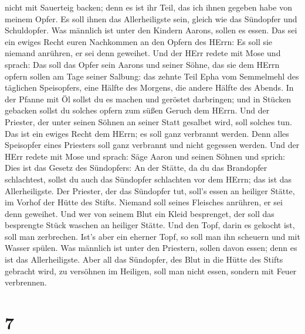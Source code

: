 nicht mit Sauerteig backen; denn es ist ihr Teil, das ich ihnen gegeben
habe von meinem Opfer. Es soll ihnen das Allerheiligste sein, gleich wie
das Sündopfer und Schuldopfer.  Was männlich ist unter den
Kindern Aarons, sollen es essen. Das sei ein ewiges Recht euren
Nachkommen an den Opfern des HErrn: Es soll sie niemand anrühren, er sei
denn geweihet.  Und der HErr redete mit Mose und sprach:
 Das soll das Opfer sein Aarons und seiner Söhne, das sie
dem HErrn opfern sollen am Tage seiner Salbung: das zehnte Teil Epha vom
Semmelmehl des täglichen Speisopfers, eine Hälfte des Morgens, die
andere Hälfte des Abends.  In der Pfanne mit Öl sollst du
es machen und geröstet darbringen; und in Stücken gebacken sollst du
solches opfern zum süßen Geruch dem HErrn.  Und der
Priester, der unter seinen Söhnen an seiner Statt gesalbet wird, soll
solches tun. Das ist ein ewiges Recht dem HErrn; es soll ganz verbrannt
werden.  Denn alles Speisopfer eines Priesters soll ganz
verbrannt und nicht gegessen werden.  Und der HErr redete
mit Mose und sprach:  Säge Aaron und seinen Söhnen und
sprich: Dies ist das Gesetz des Sündopfers: An der Stätte, da du das
Brandopfer schlachtest, sollst du auch das Sündopfer schlachten vor dem
HErrn; das ist das Allerheiligste.  Der Priester, der das
Sündopfer tut, soll's essen an heiliger Stätte, im Vorhof der Hütte des
Stifts.  Niemand soll seines Fleisches anrühren, er sei
denn geweihet. Und wer von seinem Blut ein Kleid besprenget, der soll
das besprengte Stück waschen an heiliger Stätte.  Und den
Topf, darin es gekocht ist, soll man zerbrechen. Ist's aber ein eherner
Topf, so soll man ihn scheuern und mit Wasser spülen.  Was
männlich ist unter den Priestern, sollen davon essen; denn es ist das
Allerheiligste.  Aber all das Sündopfer, des Blut in die
Hütte des Stifts gebracht wird, zu versöhnen im Heiligen, soll man nicht
essen, sondern mit Feuer verbrennen.

\hypertarget{section-6}{%
\section{7}\label{section-6}}

